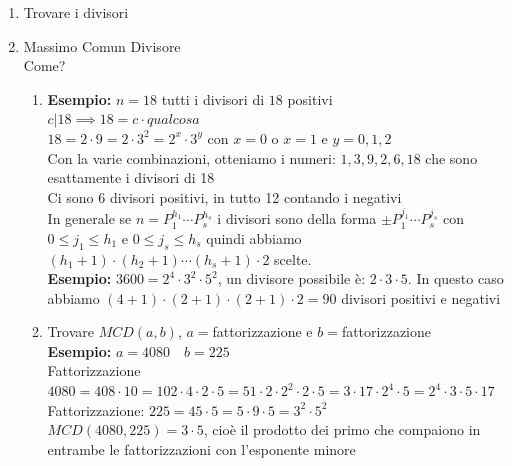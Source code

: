 \documentclass[12pt, letterpaper]{report}
\begin{document}
		\begin{enumerate}
			\item Trovare i divisori
			\item Massimo Comun Divisore \\
			Come?
			\begin{enumerate}
				\item \textbf{Esempio:} $n = 18$ tutti i divisori di $18$ positivi \\
				$c|18 \implies 18 = c \cdot qualcosa$ \\
				$18 = 2 \cdot 9 = 2 \cdot 3^2 = 2^x \cdot 3^y$ con $x=0$ o $x=1$ e $y = 0,1,2$ \\
				Con la varie combinazioni, otteniamo i numeri: $1,3,9,2,6,18$ che sono esattamente i divisori di 18 \\
				Ci sono 6 divisori positivi, in tutto 12 contando i negativi \\
				In generale se $n = P_1^{h_1} \cdots P_s^{h_s}$ i divisori sono della forma $\pm P_1^{j_1} \cdots P_s^{j_s}$ con $0 \leq j_1 \leq h_1$ e $0 \leq j_s \leq h_s$ quindi abbiamo $(h_1 + 1) \cdot (h_2 + 1) \cdots (h_s + 1) \cdot 2$ scelte. \\
				\textbf{Esempio:} $3600 = 2^4 \cdot 3^2 \cdot 5^2$, un divisore possibile è: $2 \cdot 3 \cdot 5$. In questo caso abbiamo $(4 + 1) \cdot (2 + 1) \cdot (2 + 1) \cdot 2 = 90$ divisori positivi e negativi
				\item Trovare $MCD(a,b)$, $a=$fattorizzazione e $b=$fattorizzazione \\
				\textbf{Esempio:} $a=4080 \quad b=225$ \\
				Fattorizzazione $4080 = 408 \cdot 10 = 102 \cdot 4 \cdot 2 \cdot 5  = 51 \cdot 2 \cdot 2^2 \cdot 2 \cdot 5 = 3 \cdot 17 \cdot 2^4 \cdot 5 = 2^4 \cdot 3 \cdot 5 \cdot 17$ \\
				Fattorizzazione: $225 = 45 \cdot 5 = 5 \cdot 9 \cdot 5 = 3^2 \cdot 5^2$ \\
				$MCD(4080, 225) = 3 \cdot 5$, cioè il prodotto dei primo che compaiono in entrambe le fattorizzazioni con l'esponente minore
			\end{enumerate}
		\end{enumerate}
\end{document}

